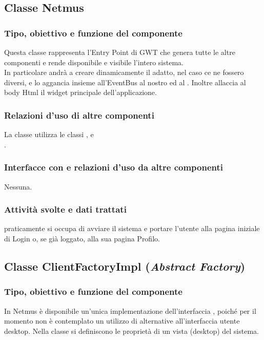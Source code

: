\subsection{Classe Netmus}
\subsubsection*{Tipo, obiettivo e funzione del componente}
Questa classe rappresenta l'Entry Point di GWT che genera tutte le altre
componenti e rende disponibile e visibile l'intero sistema.\\
In particolare andr\`a a creare dinamicamente il  adatto,
nel caso ce ne fossero diversi, e lo aggancia insieme all'EventBus al nostro
 ed al .
Inoltre allaccia al body Html il widget principale dell'applicazione.

\subsubsection*{Relazioni d'uso di altre componenti}
La classe  utilizza le classi ,
 e \\.

\subsubsection*{Interfacce con e relazioni d'uso da altre componenti}
Nessuna.

\subsubsection*{Attivit\`a svolte e dati trattati}
 praticamente si occupa di avviare il sistema e portare l'utente alla
pagina iniziale di Login o, se gi\`a loggato, alla sua pagina Profilo.

\subsection{Classe ClientFactoryImpl (\emph{Abstract Factory})}
\subsubsection*{Tipo, obiettivo e funzione del componente}
In Netmus \`e disponibile un'unica implementazione dell'interfaccia
, poich\'e per il momento non \`e contemplato un utilizzo di
alternative all'interfaccia utente desktop.
Nella classe si definiscono le propriet\`a di un vista (desktop) del
sistema.


